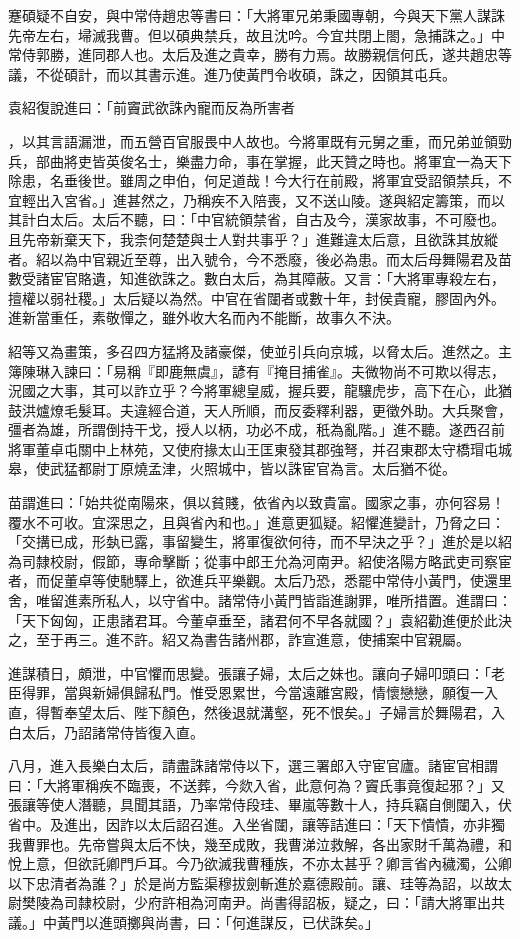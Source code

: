 \begin{pinyinscope}
蹇碩疑不自安，與中常侍趙忠等書曰：「大將軍兄弟秉國專朝，今與天下黨人謀誅先帝左右，埽滅我曹。但以碩典禁兵，故且沈吟。今宜共閉上閤，急捕誅之。」中常侍郭勝，進同郡人也。太后及進之貴幸，勝有力焉。故勝親信何氏，遂共趙忠等議，不從碩計，而以其書示進。進乃使黃門令收碩，誅之，因領其屯兵。

袁紹復說進曰：「前竇武欲誅內寵而反為所害者

，以其言語漏泄，而五營百官服畏中人故也。今將軍既有元舅之重，而兄弟並領勁兵，部曲將吏皆英俊名士，樂盡力命，事在掌握，此天贊之時也。將軍宜一為天下除患，名垂後世。雖周之申伯，何足道哉！今大行在前殿，將軍宜受詔領禁兵，不宜輕出入宮省。」進甚然之，乃稱疾不入陪喪，又不送山陵。遂與紹定籌策，而以其計白太后。太后不聽，曰：「中官統領禁省，自古及今，漢家故事，不可廢也。且先帝新棄天下，我柰何楚楚與士人對共事乎？」進難違太后意，且欲誅其放縱者。紹以為中官親近至尊，出入號令，今不悉廢，後必為患。而太后母舞陽君及苗數受諸宦官賂遺，知進欲誅之。數白太后，為其障蔽。又言：「大將軍專殺左右，擅權以弱社稷。」太后疑以為然。中官在省闥者或數十年，封侯貴寵，膠固內外。進新當重任，素敬憚之，雖外收大名而內不能斷，故事久不決。

紹等又為畫策，多召四方猛將及諸豪傑，使並引兵向京城，以脅太后。進然之。主簿陳琳入諫曰：「易稱『即鹿無虞』，諺有『掩目捕雀』。夫微物尚不可欺以得志，況國之大事，其可以詐立乎？今將軍總皇威，握兵要，龍驤虎步，高下在心，此猶鼓洪爐燎毛髮耳。夫違經合道，天人所順，而反委釋利器，更徵外助。大兵聚會，彊者為雄，所謂倒持干戈，授人以柄，功必不成，秖為亂階。」進不聽。遂西召前將軍董卓屯關中上林苑，又使府掾太山王匡東發其郡強弩，并召東郡太守橋瑁屯城皋，使武猛都尉丁原燒孟津，火照城中，皆以誅宦官為言。太后猶不從。

苗謂進曰：「始共從南陽來，俱以貧賤，依省內以致貴富。國家之事，亦何容易！覆水不可收。宜深思之，且與省內和也。」進意更狐疑。紹懼進變計，乃脅之曰：「交搆已成，形埶已露，事留變生，將軍復欲何待，而不早決之乎？」進於是以紹為司隸校尉，假節，專命擊斷；從事中郎王允為河南尹。紹使洛陽方略武吏司察宦者，而促董卓等使馳驛上，欲進兵平樂觀。太后乃恐，悉罷中常侍小黃門，使還里舍，唯留進素所私人，以守省中。諸常侍小黃門皆詣進謝罪，唯所措置。進謂曰：「天下匈匈，正患諸君耳。今董卓垂至，諸君何不早各就國？」袁紹勸進便於此決之，至于再三。進不許。紹又為書告諸州郡，詐宣進意，使捕案中官親屬。

進謀積日，頗泄，中官懼而思變。張讓子婦，太后之妹也。讓向子婦叩頭曰：「老臣得罪，當與新婦俱歸私門。惟受恩累世，今當遠離宮殿，情懷戀戀，願復一入直，得暫奉望太后、陛下顏色，然後退就溝壑，死不恨矣。」子婦言於舞陽君，入白太后，乃詔諸常侍皆復入直。

八月，進入長樂白太后，請盡誅諸常侍以下，選三署郎入守宦官廬。諸宦官相謂曰：「大將軍稱疾不臨喪，不送葬，今欻入省，此意何為？竇氏事竟復起邪？」又張讓等使人潛聽，具聞其語，乃率常侍段珪、畢嵐等數十人，持兵竊自側闥入，伏省中。及進出，因詐以太后詔召進。入坐省闥，讓等詰進曰：「天下憒憒，亦非獨我曹罪也。先帝嘗與太后不快，幾至成敗，我曹涕泣救解，各出家財千萬為禮，和悅上意，但欲託卿門戶耳。今乃欲滅我曹種族，不亦太甚乎？卿言省內穢濁，公卿以下忠清者為誰？」於是尚方監渠穆拔劍斬進於嘉德殿前。讓、珪等為詔，以故太尉樊陵為司隸校尉，少府許相為河南尹。尚書得詔板，疑之，曰：「請大將軍出共議。」中黃門以進頭擲與尚書，曰：「何進謀反，已伏誅矣。」


\end{pinyinscope}
